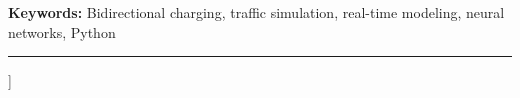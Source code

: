     \vspace{0.4em}
    \noindent\textbf{Keywords:}
    Bidirectional charging, traffic simulation, real-time modeling,
    neural networks, Python

    \vspace{0.8em}\hrule\vspace{1.2em}
]

